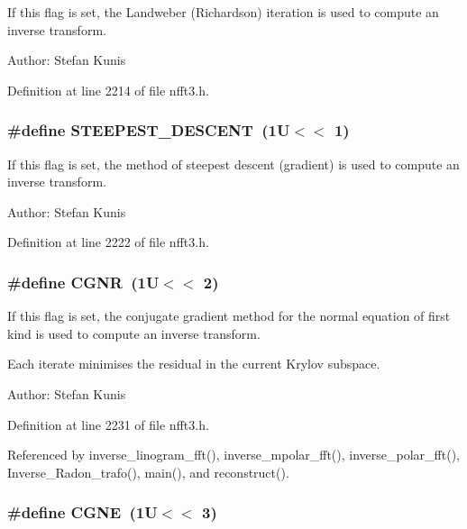 If this flag is set, the Landweber (Richardson) iteration is used to compute an inverse transform. 

\begin{Desc}
\item[Author:]Stefan Kunis \end{Desc}


Definition at line 2214 of file nfft3.h.\hypertarget{group__solver_ga36}{
\subsubsection[STEEPEST\_\-DESCENT]{\setlength{\rightskip}{0pt plus 5cm}\#define STEEPEST\_\-DESCENT~(1U$<$$<$ 1)}}
\label{group__solver_ga36}


If this flag is set, the method of steepest descent (gradient) is used to compute an inverse transform. 

\begin{Desc}
\item[Author:]Stefan Kunis \end{Desc}


Definition at line 2222 of file nfft3.h.\hypertarget{group__solver_ga37}{
\subsubsection[CGNR]{\setlength{\rightskip}{0pt plus 5cm}\#define CGNR~(1U$<$$<$ 2)}}
\label{group__solver_ga37}


If this flag is set, the conjugate gradient method for the normal equation of first kind is used to compute an inverse transform. 

Each iterate minimises the residual in the current Krylov subspace.

\begin{Desc}
\item[Author:]Stefan Kunis \end{Desc}


Definition at line 2231 of file nfft3.h.

Referenced by inverse\_\-linogram\_\-fft(), inverse\_\-mpolar\_\-fft(), inverse\_\-polar\_\-fft(), Inverse\_\-Radon\_\-trafo(), main(), and reconstruct().\hypertarget{group__solver_ga38}{
\subsubsection[CGNE]{\setlength{\rightskip}{0pt plus 5cm}\#define CGNE~(1U$<$$<$ 3)}}
\label{group__solver_ga38}


